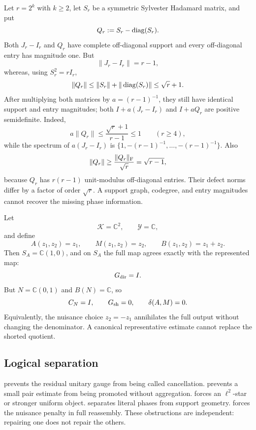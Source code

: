\begin{example}
\label{ex:tpc68-same-support-different-phase}
Let \(r=2^k\) with \(k\ge2\), let \(S_r\) be a symmetric Sylvester Hadamard matrix, and
put
\[
 Q_r:=S_r-\operatorname{diag}(S_r).
\]
Both \(J_r-I_r\) and \(Q_r\) have complete off-diagonal support and every
off-diagonal entry has magnitude one.  But
\[
 \|J_r-I_r\|=r-1,
\]
whereas, using \(S_r^2=rI_r\),
\[
 \|Q_r\|\le\|S_r\|+\|\operatorname{diag}(S_r)\|
 \le\sqrt r+1.
\]
After multiplying both matrices by \(a=(r-1)^{-1}\), they still have
identical support and entry magnitudes; both \(I+a(J_r-I_r)\) and
\(I+aQ_r\) are positive semidefinite.  Indeed,
\[
 a\|Q_r\|
 \le\frac{\sqrt r+1}{r-1}\le1
 \qquad(r\ge4),
\]
while the spectrum of \(a(J_r-I_r)\) is
\(\{1,-(r-1)^{-1},\ldots,-(r-1)^{-1}\}\).
Also
\[
 \|Q_r\|
 \ge\frac{\|Q_r\|_{\rm F}}{\sqrt r}
 =\sqrt{r-1},
\]
because \(Q_r\) has \(r(r-1)\) unit-modulus off-diagonal entries.
Their defect norms differ by
a factor of order \(\sqrt r\).  A support graph, codegree, and entry
magnitudes cannot recover the missing phase information.
\end{example}

\begin{example}
\label{ex:tpc68-shorting-kills}
Let
\[
 \mathcal K=\mathbb C^2,\qquad\mathcal Y=\mathbb C,
\]
and define
\[
 A(z_1,z_2)=z_1,\qquad
 M(z_1,z_2)=z_2,\qquad
 B(z_1,z_2)=z_1+z_2.
\]
Then \(S_A=\mathbb C(1,0)\), and on \(S_A\) the full map agrees exactly with
the represented map:
\[
 G_{\rm dir}=I.
\]
But \(N=\mathbb C(0,1)\) and \(B(N)=\mathbb C\), so
\[
 C_N=I,\qquad G_{\rm sh}=0,\qquad\delta(A,M)=0.
\]
Equivalently, the nuisance choice \(z_2=-z_1\) annihilates the full output
without changing the denominator.  A canonical representative estimate
cannot replace the shorted quotient.
\end{example}

\subsection{Logical separation}

 prevents the residual unitary gauge from
being called cancellation.
 prevents a small pair estimate
from being promoted without aggregation.
 forces an \(\ell^2\)-star or stronger
uniform object.
 separates literal phases from
support geometry.
 forces the nuisance penalty in full
reassembly.  These obstructions are independent: repairing one does not
repair the others.
